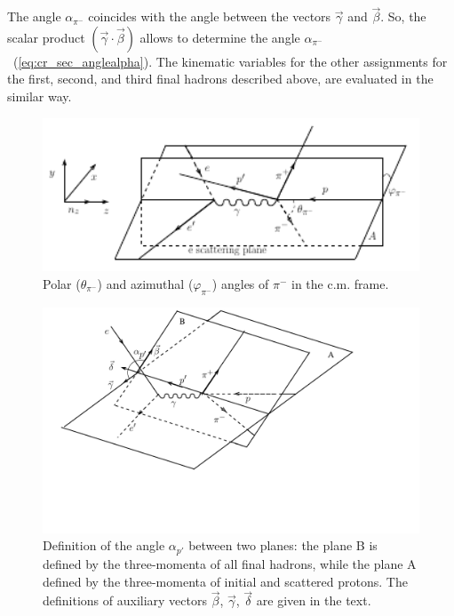 The angle $\alpha_{\pi^{-}}$ coincides with
 the angle between the vectors $\vec \gamma$ and
$\vec \beta$.
So, the scalar product $( \vec \gamma \cdot
\vec \beta )$ allows to determine the angle
$\alpha_{\pi^{-}}$~(\ref{eq:cr_sec_anglealpha}). The kinematic
variables for  the other assignments for the
first, second, and third final hadrons
described above, are evaluated in the similar
way.
\begin{figure}[htp]
\begin{center}
\includegraphics[width=12cm]{pictures/cross_sction/angles/thetaphi.pdf}
\caption{\small Polar ($\theta_{\pi^{-}}$) and azimuthal ($\varphi_{\pi^{-}}$) angles of $\pi^{-}$ in the c.m. frame.} \label{fig:cr_sec_thetaphi}
\end{center}
\end{figure}
\begin{figure}[htp]
\begin{center}
\includegraphics[width=12cm]{pictures/cross_sction/angles/alpha2.pdf}
\caption{\small Definition of the angle $\alpha_{p'}$ between two planes: the plane B is defined by the three-momenta of all final hadrons, while the plane A defined by  the three-momenta of initial and scattered protons. The definitions of  auxiliary vectors $\vec \beta$, $\vec \gamma$, $\vec \delta$ are given in the text.} \label{fig:cr_sec_kinematic1}
\end{center}
\end{figure}

